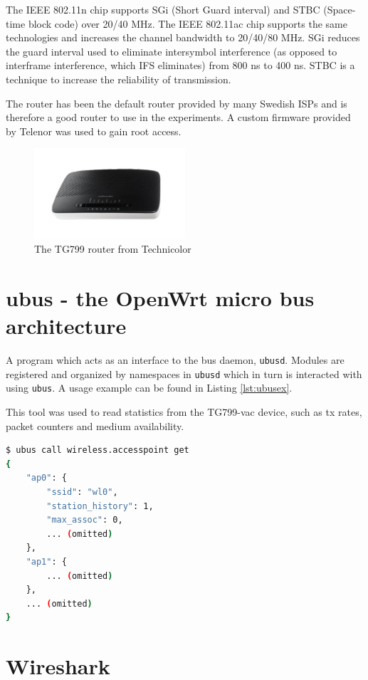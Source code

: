 The IEEE 802.11n chip supports SGi (Short Guard interval) and STBC (Space-time
block code) over 20/40 MHz. The IEEE 802.11ac chip supports the same
technologies and increases the channel bandwidth to 20/40/80 MHz. SGi reduces
the guard interval used to eliminate intersymbol interference (as opposed to
interframe interference, which IFS eliminates) from 800 ns to 400 ns. STBC is
a technique to increase the reliability of transmission.

The router has been the default router provided by many Swedish ISPs and is
therefore a good router to use in the experiments. A custom firmware provided
by Telenor was used to gain root access.

\begin{figure}
\center
\includegraphics[width=0.5\textwidth]{images/tg799.png}
\caption{The TG799 router from Technicolor}
\label{fig:tg799}
\end{figure}

\section{ubus - the OpenWrt micro bus architecture}

A program which acts as an interface to the bus daemon, \texttt{ubusd}.
Modules are registered and organized by namespaces in \texttt{ubusd} which in
turn is interacted with using \texttt{ubus}. A usage example can be found in
Listing \ref{lst:ubusex}.

This tool was used to read statistics from the TG799-vac device,
such as tx rates, packet counters and medium availability.

\begin{lstlisting}[language=bash,caption={ubus call listing all access points on this device},label=lst:ubusex]
$ ubus call wireless.accesspoint get
{
    "ap0": {
        "ssid": "wl0",
        "station_history": 1,
        "max_assoc": 0,
        ... (omitted)
    },
    "ap1": {
        ... (omitted)
    },
    ... (omitted)
}
\end{lstlisting}

\section{Wireshark}

